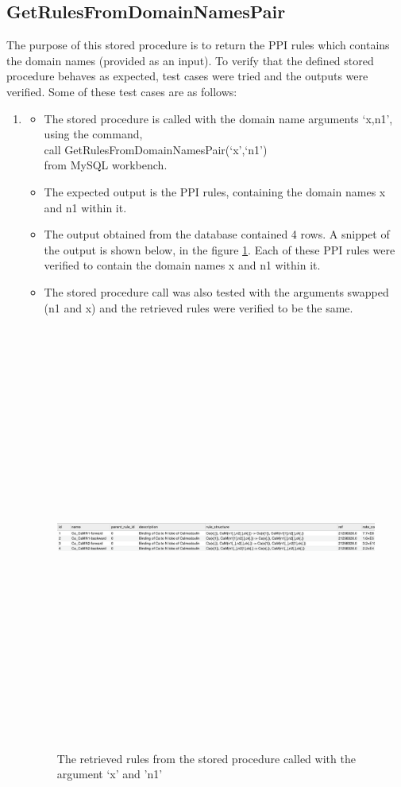 \documentclass[msc,deptreport,ai]{infthesis}      %
\begin{document}
\subsection{GetRulesFromDomainNamesPair}
The purpose of this stored procedure is to return the PPI rules which contains the domain  names (provided as an input). To verify that the defined stored procedure behaves as expected, test cases were tried and the outputs were verified. Some of these test cases are as follows: 
\begin{enumerate}
	\item 
	\begin{itemize}
		\item 	The stored procedure is called with the domain name arguments `x,n1', using the command, \\
		call GetRulesFromDomainNamesPair(`x',`n1')\\
		from MySQL workbench. 
		\item The expected output is the PPI rules, containing the domain names x and n1 within it.
		\item The output obtained from the database contained 4 rows. A snippet of the output is shown below, in the figure \ref{fig:DomainNameOutput1}. Each of these PPI rules were verified to contain the domain names x and n1 within it.
		\item The stored procedure call was also tested with the arguments swapped (n1 and x) and the retrieved rules were verified to be the same.		
	\end{itemize}
	\begin{figure}[H]
		\centering
		\captionsetup{justification=centering}
		\includegraphics[width=\linewidth,height=14cm,keepaspectratio]{DomainNameOutput1.png}	
		\caption{The retrieved rules from the stored procedure called with the argument `x' and 'n1'}
		\label{fig:DomainNameOutput1}		
	\end{figure}


\end{enumerate}
\end{document}
